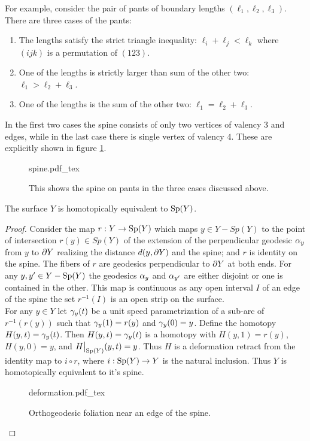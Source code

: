 \begin{exmp}\label{exmp:pants}
For example, consider the pair of pants of boundary lengths $(\ell_1,\ell_2,\ell_3)$. There are three cases of the pants: 
\begin{enumerate}
  \item The lengths satisfy the strict triangle inequality: $\ell_i + \ell_j< \ell_k$ where $(ijk)$ is a permutation of $(123)$.
  \item One of the lengths is strictly larger than sum of the other two: $\ell_1>\ell_2+ \ell_3$.
  \item One of the lengths is the sum of the other two: $\ell_1 = \ell_2 + \ell_3$.
\end{enumerate}
In the first two cases the spine consists of only two vertices of valency $3$ and edges, while in the last case there is single vertex of valency $4$. These are explicitly shown in figure \ref{fig:pants-spine}.
\begin{figure}[h]
\centering
\def\svgwidth{0.8\textwidth}
{spine.pdf_tex}
\caption[Spine on Pants]{This shows the spine on pants in the three cases discussed above.}
\label{fig:pants-spine}
\end{figure}
\end{exmp}
\begin{proposition}
  The surface $Y$ is homotopically equivalent to $\text{Sp}(Y)$.
\end{proposition}
\begin{proof}
  Consider the map $r:Y\to \text{Sp}(Y)$ which maps $y\in Y-Sp(Y)$ to the point of intersection $r(y)\in Sp(Y)$ of the extension of the perpendicular geodesic $\alpha_y$ from $y$ to $\partial Y$ realizing the distance $d(y,\partial Y)$ and the spine; and $r$ is identity on the spine. The fibers of $r$ are geodesics perpendicular to $\partial Y$ at both ends. For any $y,y'\in Y-\text{Sp}(Y)$ the geodesics $\alpha_y$ and $\alpha_{y'}$ are either disjoint or one is contained in the other. This map is continuous as any open interval $I$ of an edge of the spine the set $r^{-1}(I)$ is an open strip on the surface.\\

  For any $y\in Y$ let $\gamma_y(t)$ be a unit speed parametrization of a sub-arc of $r^{-1}(r(y))$ such that $\gamma_y(1) = r(y)$ and $\gamma_y(0) = y$. Define the homotopy $H(y,t) = \gamma_y(t)$. Then $H(y,t) = \gamma_{y}(t)$ is a homotopy with $H(y,1) = r(y)$, $H(y,0)= y$, and $H\big|_{\text{Sp}(Y)}(y,t) = y$. Thus $H$ is a deformation retract from the identity map to $i\circ r$, where $i:\text{Sp}(Y)\to Y$ is the natural inclusion. Thus $Y$ is homotopically equivalent to it's spine.
\begin{figure}[ht]
\centering
\small
\def\svgwidth{0.7\textwidth}
{deformation.pdf_tex}
\caption[Fibers of $r$]{Orthogeodesic foliation near an edge of the spine.}
\label{fig:deformation}
\end{figure}
\end{proof}

